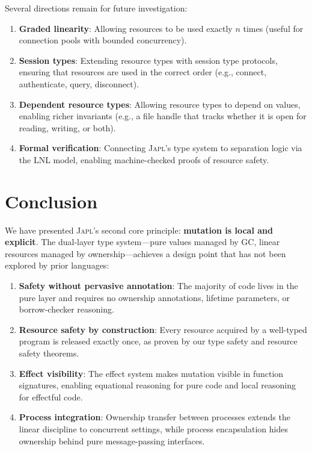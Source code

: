\documentclass[11pt]{article}
\newcommand{\JAPL}{\textsc{Japl}}
\begin{document}
Several directions remain for future investigation:

\begin{enumerate}
  \item \textbf{Graded linearity}: Allowing resources to be used
        exactly $n$ times (useful for connection pools with bounded
        concurrency).
  \item \textbf{Session types}: Extending resource types with session
        type protocols, ensuring that resources are used in the
        correct order (e.g., connect, authenticate, query, disconnect).
  \item \textbf{Dependent resource types}: Allowing resource types to
        depend on values, enabling richer invariants (e.g., a file
        handle that tracks whether it is open for reading, writing,
        or both).
  \item \textbf{Formal verification}: Connecting \JAPL{}'s type system
        to separation logic via the LNL model, enabling machine-checked
        proofs of resource safety.
\end{enumerate}


\section{Conclusion}\label{sec:conclusion}

We have presented \JAPL{}'s second core principle: \textbf{mutation is
local and explicit}.  The dual-layer type system---pure values managed
by GC, linear resources managed by ownership---achieves a design point
that has not been explored by prior languages:

\begin{enumerate}
  \item \textbf{Safety without pervasive annotation}: The majority of
        code lives in the pure layer and requires no ownership
        annotations, lifetime parameters, or borrow-checker reasoning.
  \item \textbf{Resource safety by construction}: Every resource
        acquired by a well-typed program is released exactly once,
        as proven by our type safety and resource safety theorems.
  \item \textbf{Effect visibility}: The effect system makes mutation
        visible in function signatures, enabling equational reasoning
        for pure code and local reasoning for effectful code.
  \item \textbf{Process integration}: Ownership transfer between
        processes extends the linear discipline to concurrent settings,
        while process encapsulation hides ownership behind pure
        message-passing interfaces.
\end{enumerate}
\end{document}
